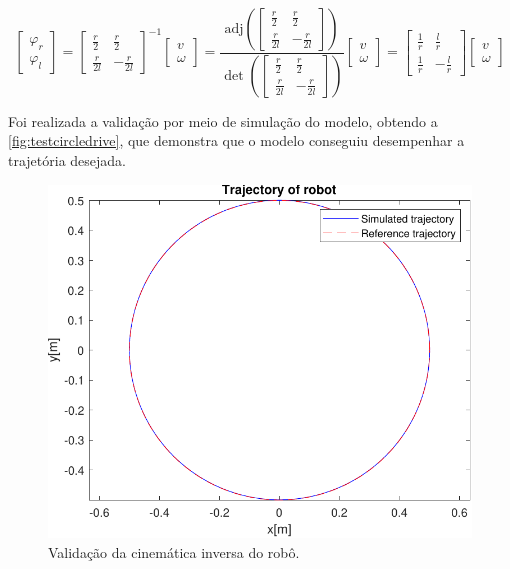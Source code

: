 \begin{equation}\label{eq:cinematicainversa}
\begin{bmatrix}
	\varphi_r \\ \varphi_l
\end{bmatrix} = \begin{bmatrix}
	\frac{r}{2} & \frac{r}{2} \\
	\frac{r}{2l} & -\frac{r}{2l} 
\end{bmatrix} ^{-1} \begin{bmatrix}
v \\ \omega
\end{bmatrix} = \frac{\text{adj}\left(\begin{bmatrix}
\frac{r}{2} & \frac{r}{2} \\
\frac{r}{2l} & -\frac{r}{2l} 
\end{bmatrix}\right)}{\det{\left(\begin{bmatrix}
\frac{r}{2} & \frac{r}{2} \\
\frac{r}{2l} & -\frac{r}{2l} 
\end{bmatrix}\right)}}\begin{bmatrix}
v \\ \omega
\end{bmatrix} = \begin{bmatrix}
\frac{1}{r} & \frac{l}{r} \\
\frac{1}{r} & -\frac{l}{r} 
\end{bmatrix} \begin{bmatrix}
v \\ \omega \end{bmatrix}
\end{equation}

Foi realizada a validação por meio de simulação do modelo, obtendo a \autoref{fig:testcircledrive}, que demonstra que o modelo conseguiu desempenhar a trajetória desejada.

\begin{figure}[H]
	\centering
	\includegraphics[width=0.5\linewidth]{img/testCircleDrive}
	\caption{Validação da cinemática inversa do robô.}
	\label{fig:testcircledrive}
\end{figure}




